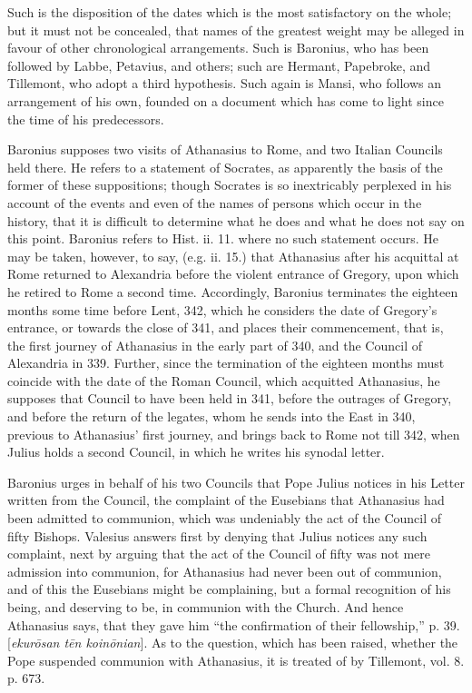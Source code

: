 Such is the disposition of the
dates which is the most satisfactory on the whole; but it must not be
concealed, that names of the greatest weight may be alleged in favour
of other chronological arrangements. Such is Baronius, who has been
followed by Labbe, Petavius, and others; such are Hermant, Papebroke,
and Tillemont, who adopt a third hypothesis. Such again is Mansi, who
follows an arrangement of his own, founded on a document which has
come to light since the time of his predecessors.

Baronius supposes two visits
of Athanasius to Rome, and two Italian Councils held there. He refers
to a statement of Socrates, as apparently the basis of the former of
these suppositions; though Socrates is so inextricably perplexed in
his account of the events and even of the names of persons which occur
in the history, that it is difficult to determine what he does and
what he does not say on this point. Baronius refers to Hist. ii. 11.
where no such statement occurs. He may be taken, however, to say,
(e.g. ii. 15.) that Athanasius after his acquittal at Rome returned to
Alexandria before the violent entrance of Gregory, upon which he
retired to Rome a second time. Accordingly, Baronius terminates the
eighteen months some time before Lent, 342, which he considers the
date of Gregory's entrance, or towards the close of 341, and places
their commencement, that is, the first journey of Athanasius in the
early part of 340, and the Council of Alexandria in 339. Further,
since the termination of the eighteen months must coincide with the
date of the Roman Council, which acquitted Athanasius, he supposes
that Council to have been held in 341, before the outrages of Gregory,
and before the return of the legates, whom he sends into the East in
340, previous to Athanasius' first journey, and brings back to Rome
not till 342, when Julius holds a second Council, in which he writes
his synodal letter.

Baronius urges in behalf of
his two Councils that Pope Julius notices in his Letter written from
the Council, the complaint of the Eusebians that Athanasius had been
admitted to communion, which was undeniably the act of the Council of
fifty Bishops. Valesius answers first by denying that Julius notices
any such complaint, next by arguing that the act of the Council of
fifty was not mere admission into communion, for Athanasius had never
been out of communion, and of this the Eusebians might be complaining,
but a formal recognition of his being, and deserving to be, in
communion with the Church. And hence Athanasius says, that they gave
him “the confirmation of their fellowship,” p. 39. [\emph{ekur\={o}san
t\={e}n koin\={o}nian}]. As to the question, which has been
raised, whether the Pope suspended communion with Athanasius, it is
treated of by Tillemont, vol. 8. p. 673.


